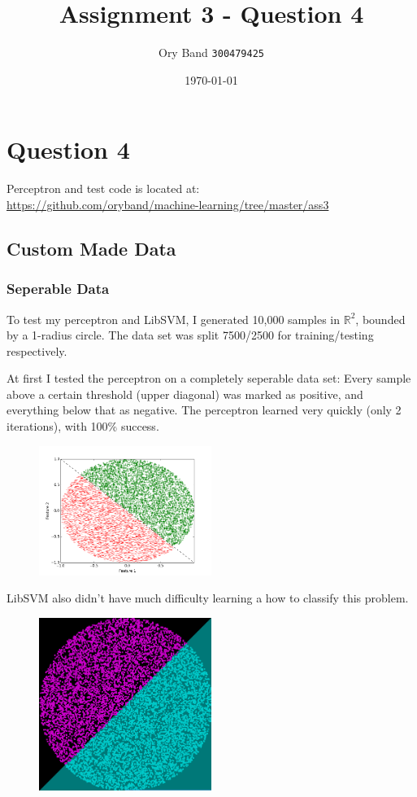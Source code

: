 \documentclass[a4paper]{article}
\title{Assignment 3 - Question 4}
\author{Ory Band \texttt{300479425}}
\date{\today}
\begin{document}
\maketitle
\newpage

\section {Question 4}

Perceptron and test code is located at:
\\
\url{https://github.com/oryband/machine-learning/tree/master/ass3}

\subsection {Custom Made Data}

\subsubsection {Seperable Data}

To test my perceptron and LibSVM,
I generated 10,000 samples in $\mathbb{R}^2$, bounded by a 1-radius circle.
The data set was split 7500/2500 for training/testing respectively.

At first I tested the perceptron on a completely seperable data set:
Every sample above a certain threshold (upper diagonal) was marked as positive,
and everything below that as negative.
The perceptron learned very quickly (only 2 iterations), with 100\% success.

\begin{figure}[h!]
    \includegraphics[width=0.5\textwidth]{images/seperable.png}
\end{figure}

LibSVM also didn't have much difficulty learning a how to classify this problem.

\begin{figure}[h!]
    \includegraphics[width=0.5\textwidth]{images/svm_seperable.png}
\end{figure}
\end{document}
